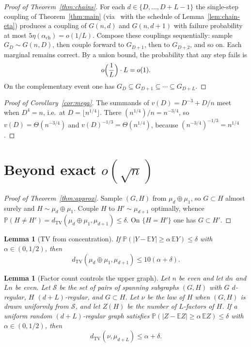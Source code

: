 \documentclass[11pt]{article}
\newtheorem{lemma}[theorem]{Lemma}
\newcommand{\EE}{\mathbb{E}}
\newcommand{\PP}{\mathbb{P}}
\newcommand{\dTV}{d_{\mathrm{TV}}}
\begin{document}
\begin{proof}[Proof of Theorem~\ref{thm:chains}]
For each \(d\in\{D,\ldots,D+L-1\}\) the single-step coupling of
Theorem~\ref{thm:main} (via~\cite[Theorem~19]{Gao21} with the schedule of
Lemma~\ref{lem:chain-eta}) produces a coupling of \(G(n,d)\) and \(G(n,d+1)\)
with failure probability at most \(5\eta(\alpha_{\mathrm{ch}})=o(1/L)\).
Compose these couplings sequentially: sample \(G_D\sim G(n,D)\), then couple
forward to \(G_{D+1}\), then to \(G_{D+2}\), and so on.
Each marginal remains correct.
By a union bound, the probability that any step fails is
\[
o\Bigl(\frac1L\Bigr)\cdot L=o(1).
\]
On the complementary event one has
\(G_D\subseteq G_{D+1}\subseteq\cdots\subseteq G_{D+L}\).
\end{proof}

\begin{proof}[Proof of Corollary~\ref{cor:mega}]
The summands of \(v(D)=D^{-3}+D/n\) meet when \(D^4=n\), i.e.\ at
\(D=\lfloor n^{1/4}\rfloor\). There \((n^{1/4})/n=n^{-3/4}\), so
\(v(D)=\Theta(n^{-3/4})\) and \(v(D)^{-1/3}=\Theta(n^{1/4})\), because
\((n^{-3/4})^{-1/3}=n^{1/4}\).
\end{proof}

\section{Beyond exact \texorpdfstring{\(o(\sqrt{n})\)}{o(sqrt(n))}}
\label{sec:beyond}

\begin{proof}[Proof of Theorem~\ref{thm:approx}]
Sample \((G,H)\) from \(\mu_d\oplus\mu_1\), so \(G\subset H\) almost surely and
\(H\sim\mu_d\oplus\mu_1\).
Couple \(H\) to \(H'\sim\mu_{d+1}\) optimally, whence
\(\PP(H\neq H')=\dTV(\mu_d\oplus\mu_1,\mu_{d+1})\le\delta\).
On \(\{H=H'\}\) one has \(G\subset H'\).
\end{proof}

\begin{lemma}[TV from concentration]
\label{lem:tv}
If \(\PP(|Y-\EE Y|\ge\alpha\,\EE Y)\le\delta\) with \(\alpha\in(0,1/2)\), then
\[
\dTV(\mu_d\oplus\mu_1,\mu_{d+1})\le 10(\alpha+\delta).
\]
\end{lemma}

\begin{lemma}[Factor count controls the upper graph]
\label{lem:factor-tv}
Let \(n\) be even and let \(dn\) and \(Ln\) be even. Let \(\mathcal{S}\) be the set of pairs of spanning subgraphs \((G,H)\) with \(G\) \(d\)-regular, \(H\) \((d+L)\)-regular, and \(G\subset H\). Let \(\nu\) be the law of \(H\) when \((G,H)\) is drawn uniformly from \(\mathcal{S}\), and let \(Z(H)\) be the number of \(L\)-factors of \(H\). If a uniform random \((d+L)\)-regular graph satisfies \(\PP(|Z-\EE Z|\ge\alpha\,\EE Z)\le\delta\) with \(\alpha\in(0,1/2)\), then
\[
\dTV(\nu,\mu_{d+L})\le\alpha+\delta.
\]
\end{lemma}
\end{document}
